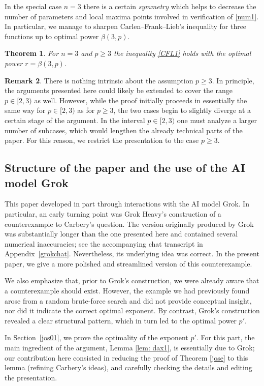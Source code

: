 \documentclass[11pt]{article}
\newtheorem{theorem}{Theorem}[section]
\theoremstyle{definition}
\newtheorem{remark}[theorem]{Remark}
\newcommand{\1}{\mathbf{1}}
\begin{document}
In the special case $n=3$ there is a certain {\em symmetry} which helps to decrease the number of parameters and local maxima points involved in verification of \eqref{num1}. In particular, we manage to sharpen Carlen--Frank--Lieb's inequality for three functions up to optimal power $\beta(3,p)$. 
\begin{theorem}\label{mth2}
    For $n=3$ and $p\geq 3$  the inequality \eqref{CFL1} holds with the optimal power $r=\beta(3,p)$.
\end{theorem}

\begin{remark}
There is nothing intrinsic about the assumption $p \ge 3$. In principle, the arguments presented here could likely be extended to cover the range $p \in [2,3)$ as well. However, while the proof initially proceeds in essentially the same way for $p \in [2,3)$ as for $p \ge 3$, the two cases begin to slightly diverge at a certain stage of the argument. In the interval $p \in [2,3)$ one must analyze a larger number of subcases, which would  lengthen the already technical parts of the paper. For this reason, we restrict the presentation to the case $p \ge 3$.
\end{remark}


\subsection{Structure of the paper and the use of the AI model Grok}

This paper developed in part through interactions with the AI model Grok. In particular, an early turning point was Grok Heavy's construction of a counterexample to Carbery's question. The version originally produced by Grok was substantially longer than the one presented here and contained several numerical inaccuracies; see the accompanying chat transcript in Appendix~\ref{grokchat}. Nevertheless, its underlying idea was correct. In the present paper, we give a more polished and streamlined version of this counterexample.

We also emphasize that, prior to Grok's construction, we were already aware that a counterexample should exist. However, the example we had previously found arose from a random brute-force search and did not provide conceptual insight, nor did it indicate the correct optimal exponent. By contrast, Grok's construction revealed a clear structural pattern, which in turn led to the optimal power $p'$.

In Section~\ref{jos01}, we prove the optimality of the exponent $p'$. For this part, the main ingredient of the argument, Lemma \ref{lem: dax1}, is essentially due to Grok; our contribution here consisted in reducing the proof of Theorem \ref{jose} to this lemma (refining Carbery's ideas), and carefully checking the details and editing the presentation.
\end{document}
